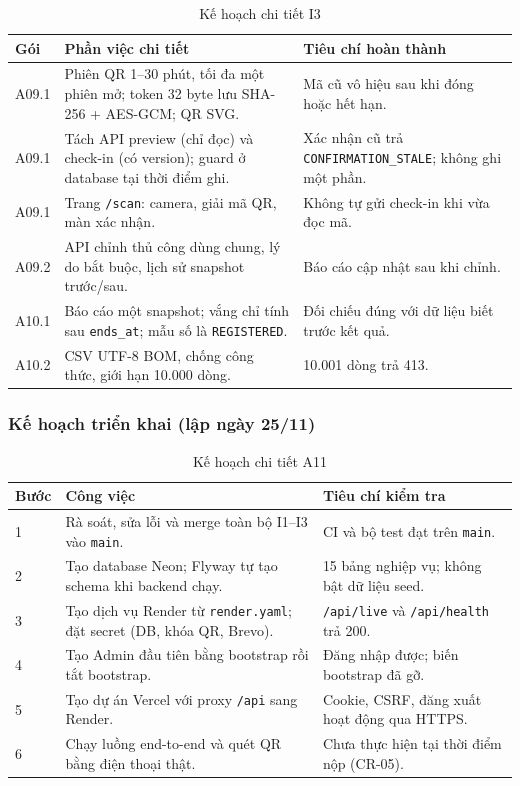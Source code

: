 \begin{table}[H]
\centering\footnotesize
\caption{Kế hoạch chi tiết I3}\label{tab:t3-lower-i3}
\begin{tabularx}{\linewidth}{@{}p{.09\linewidth}Xp{.32\linewidth}@{}}
\toprule
\textbf{Gói} & \textbf{Phần việc chi tiết} & \textbf{Tiêu chí hoàn thành}\\\midrule
A09.1 & Phiên QR 1--30 phút, tối đa một phiên mở; token 32 byte lưu SHA-256 + AES-GCM; QR SVG. & Mã cũ vô hiệu sau khi đóng hoặc hết hạn.\\
A09.1 & Tách API preview (chỉ đọc) và check-in (có version); guard ở database tại thời điểm ghi. & Xác nhận cũ trả \texttt{CONFIRMATION\_STALE}; không ghi một phần.\\
A09.1 & Trang \texttt{/scan}: camera, giải mã QR, màn xác nhận. & Không tự gửi check-in khi vừa đọc mã.\\
A09.2 & API chỉnh thủ công dùng chung, lý do bắt buộc, lịch sử snapshot trước/sau. & Báo cáo cập nhật sau khi chỉnh.\\
A10.1 & Báo cáo một snapshot; vắng chỉ tính sau \texttt{ends\_at}; mẫu số là \texttt{REGISTERED}. & Đối chiếu đúng với dữ liệu biết trước kết quả.\\
A10.2 & CSV UTF-8 BOM, chống công thức, giới hạn 10.000 dòng. & 10.001 dòng trả 413.\\
\bottomrule
\end{tabularx}
\end{table}

\subsubsection{Kế hoạch triển khai (lập ngày 25/11)}

\begin{table}[H]
\centering\footnotesize
\caption{Kế hoạch chi tiết A11}\label{tab:t3-lower-deploy}
\begin{tabularx}{\linewidth}{@{}p{.05\linewidth}Xp{.32\linewidth}@{}}
\toprule
\textbf{Bước} & \textbf{Công việc} & \textbf{Tiêu chí kiểm tra}\\\midrule
1 & Rà soát, sửa lỗi và merge toàn bộ I1--I3 vào \texttt{main}. & CI và bộ test đạt trên \texttt{main}.\\
2 & Tạo database Neon; Flyway tự tạo schema khi backend chạy. & 15 bảng nghiệp vụ; không bật dữ liệu seed.\\
3 & Tạo dịch vụ Render từ \texttt{render.yaml}; đặt secret (DB, khóa QR, Brevo). & \texttt{/api/live} và \texttt{/api/health} trả 200.\\
4 & Tạo Admin đầu tiên bằng bootstrap rồi tắt bootstrap. & Đăng nhập được; biến bootstrap đã gỡ.\\
5 & Tạo dự án Vercel với proxy \texttt{/api} sang Render. & Cookie, CSRF, đăng xuất hoạt động qua HTTPS.\\
6 & Chạy luồng end-to-end và quét QR bằng điện thoại thật. & Chưa thực hiện tại thời điểm nộp (CR-05).\\
\bottomrule
\end{tabularx}
\end{table}

